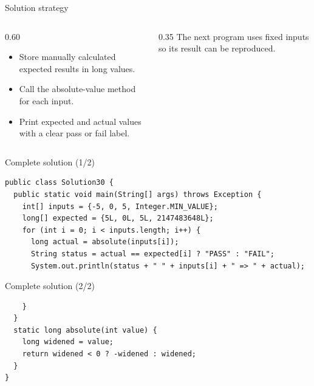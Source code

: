 \documentclass[10pt,aspectratio=169]{beamer}
\begin{document}
\begin{frame}[fragile,t]{Solution strategy}
\begin{columns}[T,onlytextwidth]\begin{column}{0.60\textwidth}
\begin{itemize}
\item Store manually calculated expected results in long values.
\item Call the absolute-value method for each input.
\item Print expected and actual values with a clear pass or fail label.
\end{itemize}
\end{column}\begin{column}{0.35\textwidth}\small
The next program uses fixed inputs so its result can be reproduced.
\end{column}\end{columns}
\end{frame}

\begin{frame}[fragile,t]{Complete solution (1/2)}
\begin{lstlisting}
public class Solution30 {
  public static void main(String[] args) throws Exception {
    int[] inputs = {-5, 0, 5, Integer.MIN_VALUE};
    long[] expected = {5L, 0L, 5L, 2147483648L};
    for (int i = 0; i < inputs.length; i++) {
      long actual = absolute(inputs[i]);
      String status = actual == expected[i] ? "PASS" : "FAIL";
      System.out.println(status + " " + inputs[i] + " => " + actual);
\end{lstlisting}
\end{frame}

\begin{frame}[fragile,t]{Complete solution (2/2)}
\begin{lstlisting}
    }
  }
  static long absolute(int value) {
    long widened = value;
    return widened < 0 ? -widened : widened;
  }
}
\end{lstlisting}
\end{frame}
\end{document}
